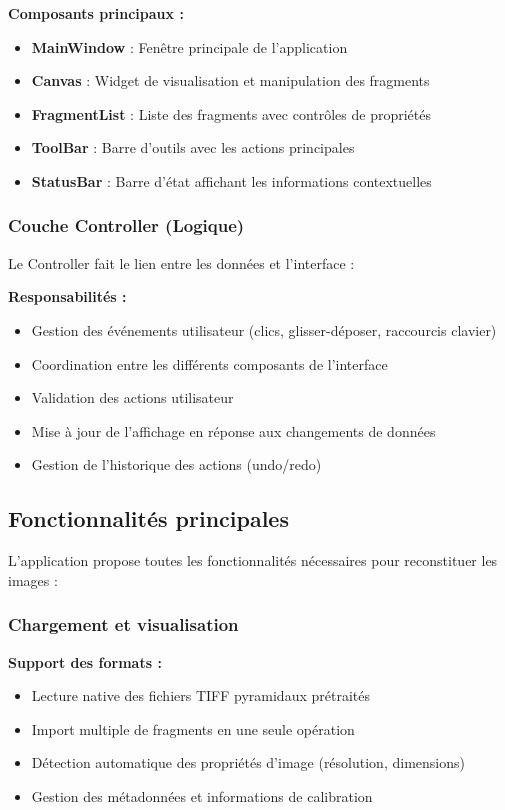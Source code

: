 \documentclass[11pt,a4paper]{report}
\begin{document}
\textbf{Composants principaux :}
\begin{itemize}
\item \textbf{MainWindow} : Fenêtre principale de l'application
\item \textbf{Canvas} : Widget de visualisation et manipulation des fragments
\item \textbf{FragmentList} : Liste des fragments avec contrôles de propriétés
\item \textbf{ToolBar} : Barre d'outils avec les actions principales
\item \textbf{StatusBar} : Barre d'état affichant les informations contextuelles
\end{itemize}

\subsubsection{Couche Controller (Logique)}

Le Controller fait le lien entre les données et l'interface :

\textbf{Responsabilités :}
\begin{itemize}
\item Gestion des événements utilisateur (clics, glisser-déposer, raccourcis clavier)
\item Coordination entre les différents composants de l'interface
\item Validation des actions utilisateur
\item Mise à jour de l'affichage en réponse aux changements de données
\item Gestion de l'historique des actions (undo/redo)
\end{itemize}

\subsection{Fonctionnalités principales}

L'application propose toutes les fonctionnalités nécessaires pour reconstituer les images :

\subsubsection{Chargement et visualisation}

\textbf{Support des formats :}
\begin{itemize}
\item Lecture native des fichiers TIFF pyramidaux prétraités
\item Import multiple de fragments en une seule opération
\item Détection automatique des propriétés d'image (résolution, dimensions)
\item Gestion des métadonnées et informations de calibration
\end{itemize}
\end{document}
